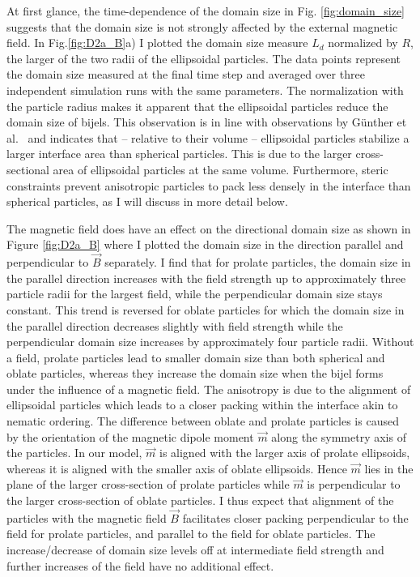 At first glance, the time-dependence of the domain size in Fig.
\ref{fig:domain_size} suggests that the domain size is not strongly
affected by the external magnetic field. In Fig.\ref{fig:D2a_B}a) I
plotted the domain size measure \(L_d\) normalized by \(R\), the larger
of the two radii of the ellipsoidal particles. The data points represent
the domain size measured at the final time step and averaged over three
independent simulation runs with the same parameters. The normalization
with the particle radius makes it apparent that the ellipsoidal
particles reduce the domain size of bijels. This observation is in line
with observations by Günther et al.~\cite{gunther_timescales_2014} and
indicates that -- relative to their volume -- ellipsoidal particles
stabilize a larger interface area than spherical particles. This is due
to the larger cross-sectional area of ellipsoidal particles at the same
volume. Furthermore, steric constraints prevent anisotropic particles to
pack less densely in the interface than spherical particles, as I will
discuss in more detail below.

The magnetic field does have an effect on the directional
domain size as shown in Figure \ref{fig:D2a_B} where I plotted the
domain size in the direction parallel and perpendicular to \(\vec{B}\)
separately. I find that for prolate particles, the domain size in the
parallel direction increases with the field strength up to approximately
three particle radii for the largest field, while the perpendicular
domain size stays constant. This trend is reversed for oblate particles
for which the domain size in the parallel direction decreases slightly
with field strength while the perpendicular domain size increases by
approximately four particle radii. Without a field, prolate
particles lead to smaller domain size than both spherical and oblate
particles, whereas they increase the domain size when the bijel forms under the
influence of a magnetic field. The anisotropy is due to the alignment of
ellipsoidal particles which leads to a closer packing within the
interface akin to nematic ordering. The difference between oblate and
prolate particles is caused by the orientation of the magnetic dipole
moment \(\vec{m}\) along the symmetry axis of the particles. In our
model, \(\vec{m}\) is aligned with the larger axis of prolate
ellipsoids, whereas it is aligned with the smaller axis of oblate
ellipsoids. Hence \(\vec{m}\) lies in the plane of the larger
cross-section of prolate particles while \(\vec{m}\) is perpendicular to
the larger cross-section of oblate particles. I thus expect that
alignment of the particles with the magnetic field \(\vec{B}\)
facilitates closer packing perpendicular to the field for prolate
particles, and parallel to the field for oblate particles. The
increase/decrease of domain size levels off at intermediate field
strength and further increases of the field have no additional effect.

